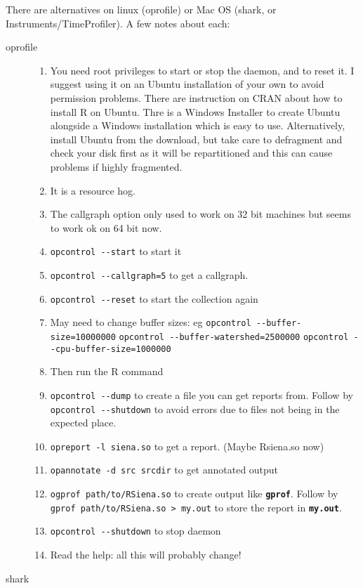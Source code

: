 \documentclass[12pt, a4paper]{article}
\renewcommand{\=}{\,=\,}
\newcommand{\+}{\,+\,}
\newcommand{\sfn}[1]{\textbf{\texttt{#1}}}
\begin{document}
There are alternatives on linux (\textsf{oprofile}) or Mac OS (\textsf{shark},
or
\textsf{Instruments/TimeProfiler}).
A few notes about each:
\begin{description}
\item[oprofile]
\begin{enumerate}
\item You need root privileges to start or stop the daemon,
  and to reset it. I suggest using it on an Ubuntu installation of your own to
  avoid permission problems. There are instruction on CRAN about how to install
  R on Ubuntu. Thre is a Windows Installer to create Ubuntu alongside a Windows
  installation which is easy to use. Alternatively, install Ubuntu from the
  download, but take care to defragment and check your disk first as it will be
  repartitioned and this can cause problems if highly fragmented.
\item It is a resource hog.
\item The callgraph option only used to work on 32 bit machines but seems to
  work ok on 64 bit now.
\item \verb|opcontrol --start| to start it
\item \verb|opcontrol --callgraph=5| to get a callgraph.
\item \verb|opcontrol --reset| to start the collection again
\item May need to change buffer sizes: eg
\verb|opcontrol --buffer-size=10000000|
\verb|opcontrol --buffer-watershed=2500000|
\verb|opcontrol --cpu-buffer-size=1000000|
\item Then run the R command
\item \verb|opcontrol --dump| to create a file you can get reports from.
Follow by \verb|opcontrol --shutdown| to avoid errors due to files not being in
the expected place.
\item \verb|opreport -l siena.so| to get a report. (Maybe Rsiena.so now)
\item \verb|opannotate -d src srcdir| to get annotated output
\item \verb|ogprof path/to/RSiena.so| to create output like \sfn{gprof}.
Follow by
\verb|gprof path/to/RSiena.so > my.out| to store the report in \sfn{my.out}.
\item \verb|opcontrol --shutdown| to stop daemon
\item Read the help: all this will probably change!
\end{enumerate}
\item[shark]
\begin{enumerate}

\end{enumerate}
\end{description}
\end{document}
